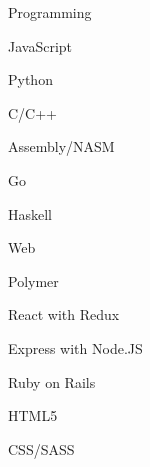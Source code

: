 


\begin{cvskills}


\cvskill
{Programming} %
{\begin{skillsitems}
\item JavaScript
\item Python
\item C/C++
\item Assembly/NASM
\item Go
\item Haskell
\end{skillsitems}
}


\cvskill
{Web} %
{
\begin{skillsitems}
\item Polymer
\item React with Redux
\item Express with Node.JS
\item Ruby on Rails
\item HTML5
\item CSS/SASS
\end{skillsitems}
} %


\end{cvskills}
